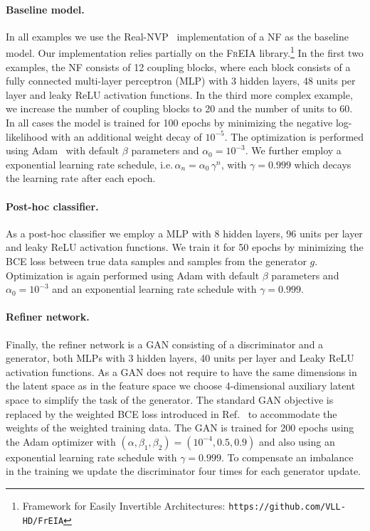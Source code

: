 \paragraph{Baseline model.}
In all examples we use the Real-NVP~\cite{RNVP2019} implementation of a NF as the baseline model. Our implementation relies partially on the \textsc{FrEIA} library.\footnote{Framework for Easily Invertible Architectures: \texttt{https://github.com/VLL-HD/FrEIA}}
In the first two examples, the NF consists of 12 coupling blocks, where each block consists of a fully connected multi-layer perceptron (MLP) with 3 hidden layers, 48 units per layer and leaky ReLU activation functions. In the third more complex example, we increase the number of coupling blocks to 20 and the number of units to 60. In all cases the model is trained for 100 epochs by minimizing the negative log-likelihood with an additional weight decay of $10^{-5}$. The optimization is performed using Adam~\cite{Adam2019} with default $\beta$ parameters and $\alpha_0 = 10^{-3}$. We further employ a exponential learning rate schedule, i.e.\,$\alpha_n = \alpha_0\,\gamma^n$,
with $\gamma = 0.999$ which decays the learning rate after each epoch.

\paragraph{Post-hoc classifier.}
As a post-hoc classifier we employ a MLP with 8 hidden layers, 96 units per layer and leaky ReLU activation functions. We train it for 50 epochs by minimizing the BCE loss between true data samples and samples from the generator $g$. Optimization is again performed using Adam with default $\beta$ parameters and $\alpha_0 = 10^{-3}$ and an exponential learning rate schedule with $\gamma = 0.999$.

\paragraph{Refiner network.}
Finally, the refiner network is a GAN consisting of a discriminator and a generator, both MLPs with 3 hidden layers, 40 units per layer and Leaky ReLU activation functions.
As a GAN does not require to have the same dimensions in the latent space as in the feature space we choose 4-dimensional auxiliary latent space to simplify the task of the generator. The standard GAN objective is replaced by the weighted BCE loss introduced in Ref.~\cite{Backes:2020vka} to accommodate the weights of the weighted training data. The GAN is trained for 200 epochs using the Adam optimizer with $(\alpha, \beta_1, \beta_2) = (10^{-4}, 0.5, 0.9)$ and also using an exponential learning rate schedule with $\gamma = 0.999$. To compensate an imbalance in the training we update the discriminator four times for each generator update.

